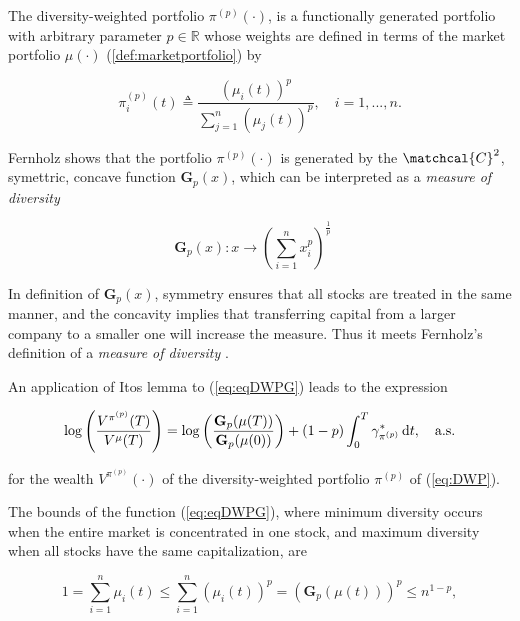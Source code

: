 \documentclass[british]{amsart} \usepackage{lmodern}
\numberwithin{equation}{section} \numberwithin{figure}{section}
\theoremstyle{plain} \newtheorem{thm}{\protect\theoremname}[section]
\theoremstyle{definition} \newtheorem{defn}[thm]{\protect\definitionname}
\theoremstyle{plain} \newtheorem{assumption}[thm]{\protect\assumptionname}
\theoremstyle{plain} \newtheorem{lem}[thm]{\protect\lemmaname}
\theoremstyle{plain} \newtheorem{prop}[thm]{\protect\propositionname}
\theoremstyle{remark} \newtheorem{rem}[thm]{\protect\remarkname}
\theoremstyle{plain} \newtheorem{cor}[thm]{\protect\corollaryname}
\renewcommand{\d}[1]{\mathop{\mathrm{d}{#1}}}
\begin{document}
The diversity-weighted portfolio $\pi^{(p)}(\cdot)$, is a functionally generated
portfolio with arbitrary parameter $p\in\mathbb{R}$ whose weights are defined 
in terms of the market portfolio $\mu(\cdot)$ (\ref{def:marketportfolio}) by

\begin{equation}
 \label{eq:DWP}
 \pi_{i}^{(p)}(t) \triangleq 
      \frac{ \left(\mu_{i}(t)\right)^{p} }
           {\sum_{j=1}^{n}\left(\mu_{j}(t)\right)^{p}},
   \quad i=1,...,n.
\end{equation}

\newcommand{\Gp}[1]{\mathbf{G}_{p}(#1)}

Fernholz \cite[Equation 7.3]{fernholz2009} shows that the portfolio
$\pi^{(p)}(\cdot)$ is generated by the $\matchcal{C}^2$, symettric, concave
function $\Gp{x}$, which can be interpreted as a \textit{measure of diversity}

\begin{equation}
  \label{eq:eqDWPG}
  \Gp{x}:x\to\left(\sum_{i=1}^{n}x_{i}^{p}\right)^{\frac{1}{p}}
  \quad
\end{equation}

In definition of $\Gp{x}$, symmetry ensures that all stocks are treated in the
same manner, and the concavity implies that transferring capital from a larger
company to a smaller one will increase the measure. Thus it meets Fernholz's definition
of a \textit{measure of diversity} \cite[Definition 4.3]{fernholz1999pgf}.

An application of Itos lemma to (\ref{eq:eqDWPG}) leads to the expression

\begin{equation}
  \log \left( \frac{V^{\pi^{(p)}}(T)}{V^{\mu}(T)} \right) = 
  \log \left( \frac{\Gp{\mu(T)}}{\Gp{\mu(0)}} \right) + 
    (1-p)\int_{0}^{T}\gamma_{\pi^{(p)}}^{*}\d{t},
  \quad \almostsurely
\end{equation}

for the wealth $V^{\pi^{(p)}}(\cdot)$ of the diversity-weighted portfolio
$\pi^{(p)}$ of (\ref{eq:DWP}).

The bounds of the function (\ref{eq:eqDWPG}), where minimum diversity occurs when the
entire market is concentrated in one stock, and maximum diversity when all
stocks have the same capitalization, are

\begin{equation}
  1 = \sum_{i=1}^{n} \mu_{i}(t) \le \sum_{i=1}^{n} (\mu_{i}(t))^p
    = \left( \Gp{\mu(t)} \right)^p \le n^{1-p},
\end{equation}
\end{document}
